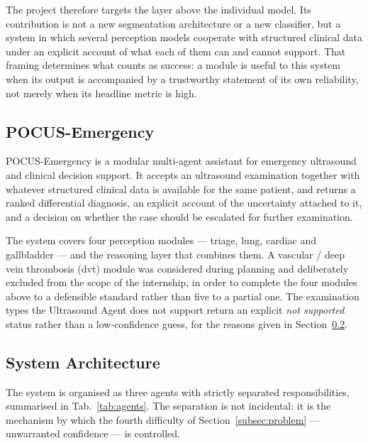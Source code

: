 The project therefore targets the layer above the individual model. Its contribution is
not a new segmentation architecture or a new classifier, but a system in which several
perception models cooperate with structured clinical data under an explicit account of
what each of them can and cannot support. That framing determines what counts as success:
a module is useful to this system when its output is accompanied by a trustworthy
statement of its own reliability, not merely when its headline metric is high.

\subsection{POCUS-Emergency}
\label{subsec:pocus-emergency}

POCUS-Emergency is a modular multi-agent assistant for emergency ultrasound and clinical
decision support. It accepts an ultrasound examination together with whatever structured
clinical data is available for the same patient, and returns a ranked differential
diagnosis, an explicit account of the uncertainty attached to it, and a decision on
whether the case should be escalated for further examination.

The system covers four perception modules --- triage, lung, cardiac and gallbladder ---
and the reasoning layer that combines them. A vascular / deep vein thrombosis (\gls{dvt})
module was considered
during planning and deliberately excluded from the scope of the internship, in order to
complete the four modules above to a defensible standard rather than five to a partial
one. The examination types the Ultrasound Agent does not support return an explicit
\textit{not supported} status rather than a low-confidence guess, for the reasons given in
Section~\ref{subsec:architecture}.

\subsection{System Architecture}
\label{subsec:architecture}

The system is organised as three agents with strictly separated responsibilities,
summarised in Tab.~\ref{tab:agents}. The separation is not incidental: it is the mechanism
by which the fourth difficulty of Section~\ref{subsec:problem} --- unwarranted confidence
--- is controlled.

